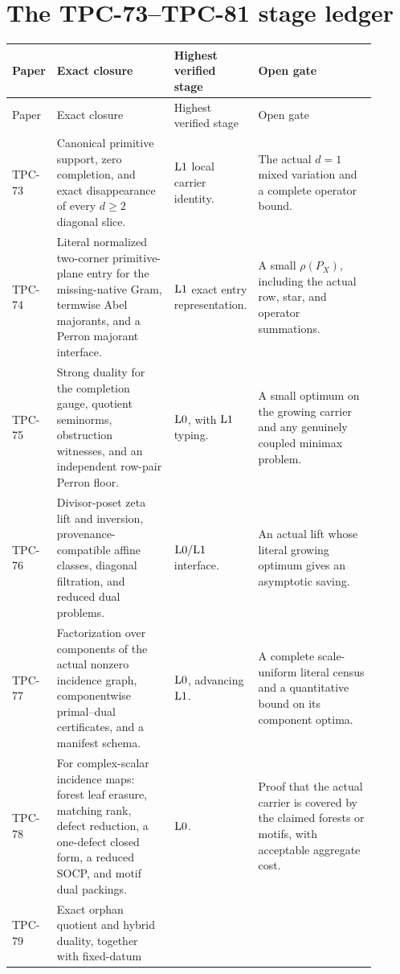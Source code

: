 \section{The TPC-73--TPC-81 stage ledger}
\label{sec:stage-ledger}

\begingroup
\small
{}
\setlength{\tabcolsep}{3pt}
\renewcommand{\arraystretch}{1.12}
\begin{longtable}{@{}p{0.075\linewidth}p{0.34\linewidth}
 p{0.135\linewidth}p{0.355\linewidth}@{}}
\toprule
Paper & Exact closure & Highest verified stage & Open gate \\
\midrule
\endfirsthead
\toprule
Paper & Exact closure & Highest verified stage & Open gate \\
\midrule
\endhead
TPC-73 &
Canonical primitive support, zero completion, and exact disappearance
of every \(d\ge2\) diagonal slice. &
\(\mathrm{L1}\) local carrier identity. &
The actual \(d=1\) mixed variation and a complete operator bound.
\\
TPC-74 &
Literal normalized two-corner primitive-plane entry for the
missing-native Gram, termwise Abel majorants, and a Perron majorant
interface. &
\(\mathrm{L1}\) exact entry representation. &
A small \(\rho(P_X)\), including the actual row, star, and operator
summations.
\\
TPC-75 &
Strong duality for the completion gauge, quotient seminorms,
obstruction witnesses, and an independent row-pair Perron floor. &
\(\mathrm{L0}\), with \(\mathrm{L1}\) typing. &
A small optimum on the growing carrier and any genuinely coupled
minimax problem.
\\
TPC-76 &
Divisor-poset zeta lift and inversion, provenance-compatible affine
classes, diagonal filtration, and reduced dual problems. &
\(\mathrm{L0}/\mathrm{L1}\) interface. &
An actual lift whose literal growing optimum gives an asymptotic
saving.
\\
TPC-77 &
Factorization over components of the actual nonzero incidence graph,
componentwise primal--dual certificates, and a manifest schema. &
\(\mathrm{L0}\), advancing \(\mathrm{L1}\). &
A complete scale-uniform literal census and a quantitative bound on
its component optima.
\\
TPC-78 &
For complex-scalar incidence maps: forest leaf erasure, matching
rank, defect reduction, a one-defect closed form, a reduced SOCP, and
motif dual packings. &
\(\mathrm{L0}\). &
Proof that the actual carrier is covered by the claimed forests or
motifs, with acceptable aggregate cost.
\\
TPC-79 &
Exact orphan quotient and hybrid duality, together with fixed-datum

\end{longtable}
